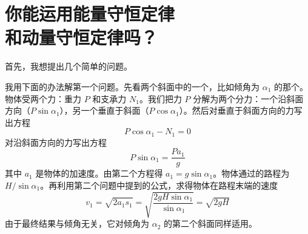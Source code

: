 \chapter[你能运用能量守恒定律和动量守恒定律吗？]{你能运用能量守恒定律\\和动量守恒定律吗？\label{ch-10}}

\begin{dialogue}

\tchr 首先，我想提出几个简单的问题。
\begin{description}[leftmargin=1cm]
\item[第一个问题：] 

\item[第二个问题：] 

\item[第三个问题：] 

\item[第四个问题：] 
\end{description}

\stda 我用下面的办法解第一个问题。先看两个斜面中的一个，比如倾角为 $\alpha_{1}$ 的那个。物体受两个力：重力 $P$ 和支承力 $N_{1}$。我们把力 $P$ 分解为两个分力：一个沿斜面方向（$P \sin \alpha_{1}$），另一个垂直于斜面（$P \cos \alpha_{1}$）。然后对垂直于斜面方向的力写出方程
\begin{equation*}%
P \cos \alpha_{1} - N_{1} = 0
\end{equation*}
对沿斜面方向的力写出方程
\begin{equation*}%
P \sin \alpha_{1}  = \frac{P a_{1}}{g}
\end{equation*}
其中 $a_{1}$ 是物体的加速度。由第二个方程得 $a_{1} =g \sin \alpha_{1}$。物体通过的路程为 $H/\sin \alpha_{1}$。再利用第二个问题中提到的公式，求得物体在路程末端的速度
\begin{equation*}%
v_{1}  = \sqrt{2a_{1}s_{1}} = \sqrt{\frac{2gH \sin \alpha_{1}}{\sin \alpha_{1}}} = \sqrt{2gH}
\end{equation*}
由于最终结果与倾角无关，它对倾角为 $\alpha_{2}$ 的第二个斜面同样适用。


\end{dialogue}
